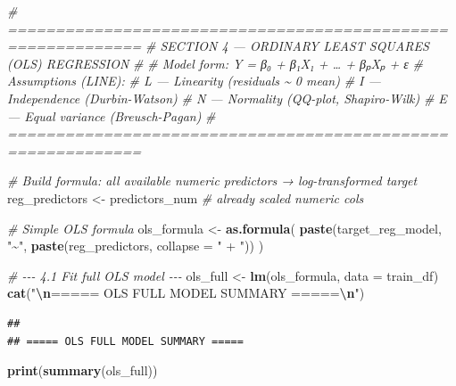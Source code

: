 \documentclass[
]{article}
\newenvironment{Shaded}{\begin{snugshade}}{\end{snugshade}}
\newcommand{\AttributeTok}[1]{\textcolor[rgb]{0.13,0.29,0.53}{#1}}
\newcommand{\CommentTok}[1]{\textcolor[rgb]{0.56,0.35,0.01}{\textit{#1}}}
\newcommand{\FunctionTok}[1]{\textcolor[rgb]{0.13,0.29,0.53}{\textbf{#1}}}
\newcommand{\NormalTok}[1]{#1}
\newcommand{\OtherTok}[1]{\textcolor[rgb]{0.56,0.35,0.01}{#1}}
\newcommand{\SpecialCharTok}[1]{\textcolor[rgb]{0.81,0.36,0.00}{\textbf{#1}}}
\newcommand{\StringTok}[1]{\textcolor[rgb]{0.31,0.60,0.02}{#1}}
\begin{document}
\begin{Shaded}
\begin{Highlighting}[]
\CommentTok{\# ============================================================}
\CommentTok{\#  SECTION 4 — ORDINARY LEAST SQUARES (OLS) REGRESSION}
\CommentTok{\#}
\CommentTok{\#  Model form:  Y = β₀ + β₁X₁ + … + βₚXₚ + ε}
\CommentTok{\#  Assumptions (LINE):}
\CommentTok{\#    L — Linearity       (residuals \textasciitilde{} 0 mean)}
\CommentTok{\#    I — Independence    (Durbin{-}Watson)}
\CommentTok{\#    N — Normality       (QQ{-}plot, Shapiro{-}Wilk)}
\CommentTok{\#    E — Equal variance  (Breusch{-}Pagan)}
\CommentTok{\# ============================================================}

\CommentTok{\# Build formula: all available numeric predictors → log{-}transformed target}
\NormalTok{reg\_predictors }\OtherTok{\textless{}{-}}\NormalTok{ predictors\_num   }\CommentTok{\# already scaled numeric cols}

\CommentTok{\# Simple OLS formula}
\NormalTok{ols\_formula }\OtherTok{\textless{}{-}} \FunctionTok{as.formula}\NormalTok{(}
  \FunctionTok{paste}\NormalTok{(target\_reg\_model, }\StringTok{"\textasciitilde{}"}\NormalTok{, }\FunctionTok{paste}\NormalTok{(reg\_predictors, }\AttributeTok{collapse =} \StringTok{" + "}\NormalTok{))}
\NormalTok{)}

\CommentTok{\# {-}{-}{-} 4.1  Fit full OLS model {-}{-}{-}}
\NormalTok{ols\_full }\OtherTok{\textless{}{-}} \FunctionTok{lm}\NormalTok{(ols\_formula, }\AttributeTok{data =}\NormalTok{ train\_df)}
\FunctionTok{cat}\NormalTok{(}\StringTok{"}\SpecialCharTok{\textbackslash{}n}\StringTok{===== OLS FULL MODEL SUMMARY =====}\SpecialCharTok{\textbackslash{}n}\StringTok{"}\NormalTok{)}
\end{Highlighting}
\end{Shaded}

\begin{verbatim}
## 
## ===== OLS FULL MODEL SUMMARY =====
\end{verbatim}

\begin{Shaded}
\begin{Highlighting}[]
\FunctionTok{print}\NormalTok{(}\FunctionTok{summary}\NormalTok{(ols\_full))}
\end{Highlighting}
\end{Shaded}
\end{document}
